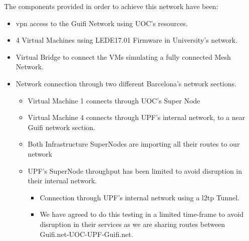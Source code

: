 The components provided in order to achieve this network have been:
\begin{itemize}
    \item \acrshort{vpn} access to the Guifi Network using UOC's resources.
    \item 4 Virtual Machines using LEDE17.01 Firmware in University's network.
    \item Virtual Bridge to connect the VMs simulating a fully connected Mesh Network.
    \item Network connection through two different Barcelona's network sections.
    \begin{itemize}
        \item Virtual Machine 1 connects through UOC's Super Node
        \item Virtual Machine 4 connects through UPF's internal network, to a near Guifi network section.
        \item Both Infrastructure SuperNodes are importing all their routes to our network
        \item UPF's SuperNode throughput has been limited to avoid disruption in their internal network.
        \begin{itemize}
            \item Connection through UPF's internal network using a \Gls{l2tp} Tunnel.
            \item We have agreed to do this testing in a limited time-frame to avoid disruption in their services as we are sharing routes between Guifi.net-UOC-UPF-Guifi.net.
        \end{itemize}
    \end{itemize}
\end{itemize}

